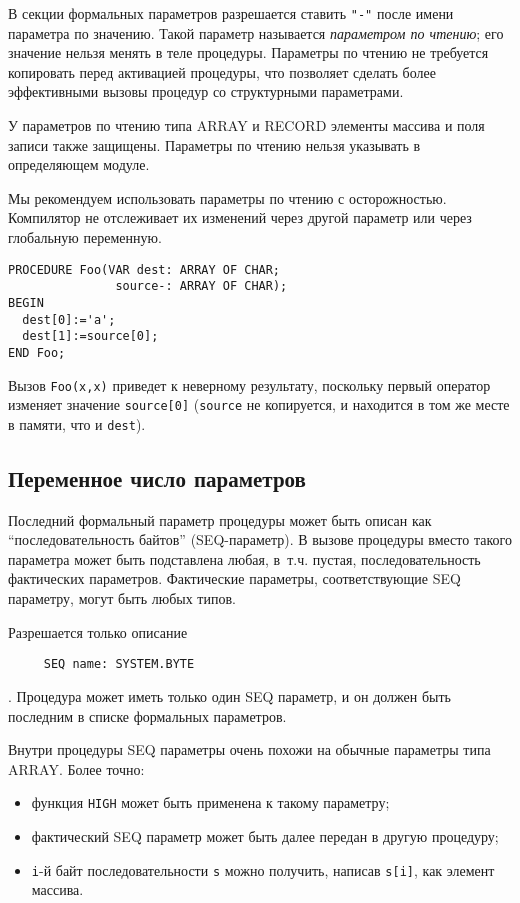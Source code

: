 \mextonly

В секции формальных параметров разрешается ставить \verb|"-"| 
после имени параметра по значению. Такой параметр называется
{\em параметром по чтению}; его значение нельзя менять в теле
процедуры. Параметры по чтению не требуется копировать перед активацией
процедуры, что позволяет сделать более эффективными вызовы 
процедур со структурными параметрами.

У параметров по чтению типа ARRAY и RECORD элементы 
массива и поля записи также защищены. Параметры по чтению нельзя 
указывать в определяющем модуле.

Мы рекомендуем использовать параметры по чтению с осторожностью.
Компилятор не отслеживает их изменений через другой параметр
или через глобальную переменную.

\Example
\begin{verbatim}
PROCEDURE Foo(VAR dest: ARRAY OF CHAR;
               source-: ARRAY OF CHAR);
BEGIN
  dest[0]:='a';
  dest[1]:=source[0];
END Foo;
\end{verbatim}

Вызов \verb|Foo(x,x)| приведет к неверному результату, поскольку
первый оператор изменяет значение
\verb|source[0]| (\verb|source| не копируется, и находится в том же месте
в памяти, что и \verb|dest|).

\subsection{Переменное число параметров}\label{m2:SEQ:param}

\mextonly

Последний формальный параметр процедуры может быть описан как
``последовательность байтов'' (SEQ-параметр). В вызове процедуры
вместо такого параметра может быть подставлена любая, в~т.ч. пустая,
последовательность фактических параметров. Фактические параметры,
соответствующие SEQ параметру, могут быть любых типов.

Разрешается только описание
\begin{verbatim}
     SEQ name: SYSTEM.BYTE
\end{verbatim}. 
Процедура может иметь только один
SEQ параметр, и он должен быть последним в списке формальных параметров.

Внутри процедуры SEQ параметры очень похожи на обычные параметры типа
ARRAY. Более точно:
\begin{itemize}
\item функция {\tt HIGH} может быть применена к такому параметру;
\item фактический SEQ параметр может быть далее передан в другую процедуру;
\item \verb|i|-й байт последовательности \verb|s|
можно получить, написав \verb|s[i]|, как элемент массива.
\end{itemize}


